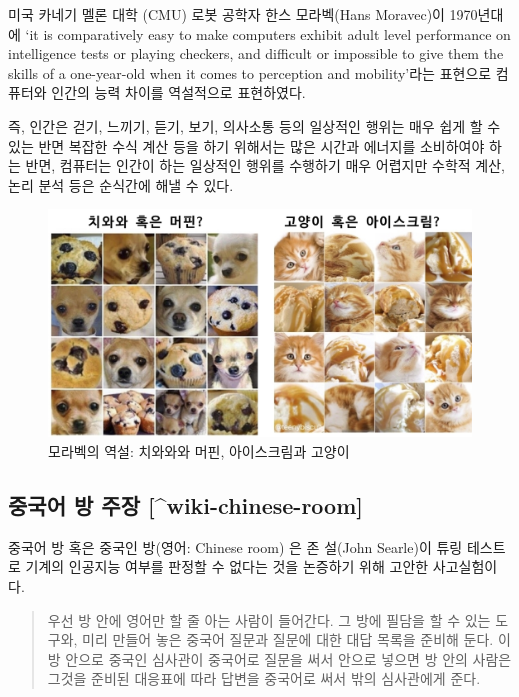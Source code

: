 \documentclass[smallextended]{svjour3}       %
\begin{document}
미국 카네기 멜론 대학 (CMU) 로봇 공학자 한스 모라벡(Hans Moravec)이
1970년대에 `it is comparatively easy to make computers exhibit adult
level performance on intelligence tests or playing checkers, and
difficult or impossible to give them the skills of a one-year-old when
it comes to perception and mobility'라는 표현으로 컴퓨터와 인간의 능력
차이를 역설적으로 표현하였다.

즉, 인간은 걷기, 느끼기, 듣기, 보기, 의사소통 등의 일상적인 행위는 매우
쉽게 할 수 있는 반면 복잡한 수식 계산 등을 하기 위해서는 많은 시간과
에너지를 소비하여야 하는 반면, 컴퓨터는 인간이 하는 일상적인 행위를
수행하기 매우 어렵지만 수학적 계산, 논리 분석 등은 순식간에 해낼 수
있다.

\begin{figure}

{\centering \includegraphics[width=1\linewidth]{fig/moravec-paradox} 

}

\caption{모라벡의 역설: 치와와와 머핀, 아이스크림과 고양이}\label{fig:unnamed-chunk-4}
\end{figure}

\hypertarget{chinese-room}{%
\subsection{중국어 방 주장
{[}\^{}wiki-chinese-room{]}}\label{chinese-room}}

중국어 방 혹은 중국인 방(영어: Chinese room) \cite{wikipedia_2019}은 존
설(John Searle)이 튜링 테스트로 기계의 인공지능 여부를 판정할 수 없다는
것을 논증하기 위해 고안한 사고실험이다.

\begin{quote}
우선 방 안에 영어만 할 줄 아는 사람이 들어간다. 그 방에 필담을 할 수
있는 도구와, 미리 만들어 놓은 중국어 질문과 질문에 대한 대답 목록을
준비해 둔다. 이 방 안으로 중국인 심사관이 중국어로 질문을 써서 안으로
넣으면 방 안의 사람은 그것을 준비된 대응표에 따라 답변을 중국어로 써서
밖의 심사관에게 준다.
\end{quote}
\end{document}

